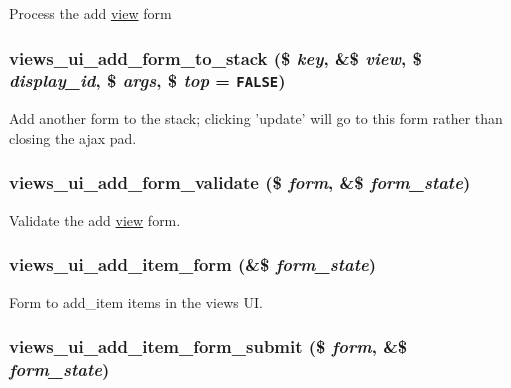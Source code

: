 Process the add \hyperlink{classview}{view} form \hypertarget{admin_8inc_1bdfd28818165d752db6270d3676fcbb}{
\subsubsection[{views\_\-ui\_\-add\_\-form\_\-to\_\-stack}]{\setlength{\rightskip}{0pt plus 5cm}views\_\-ui\_\-add\_\-form\_\-to\_\-stack (\$ {\em key}, \/  \&\$ {\em view}, \/  \$ {\em display\_\-id}, \/  \$ {\em args}, \/  \$ {\em top} = {\tt FALSE})}}
\label{admin_8inc_1bdfd28818165d752db6270d3676fcbb}


Add another form to the stack; clicking 'update' will go to this form rather than closing the ajax pad. \hypertarget{admin_8inc_3df2229c5921bd94cf778c96d8630b6a}{
\subsubsection[{views\_\-ui\_\-add\_\-form\_\-validate}]{\setlength{\rightskip}{0pt plus 5cm}views\_\-ui\_\-add\_\-form\_\-validate (\$ {\em form}, \/  \&\$ {\em form\_\-state})}}
\label{admin_8inc_3df2229c5921bd94cf778c96d8630b6a}


Validate the add \hyperlink{classview}{view} form. \hypertarget{admin_8inc_c391db5551c2725f1c483ea09bc6551a}{
\subsubsection[{views\_\-ui\_\-add\_\-item\_\-form}]{\setlength{\rightskip}{0pt plus 5cm}views\_\-ui\_\-add\_\-item\_\-form (\&\$ {\em form\_\-state})}}
\label{admin_8inc_c391db5551c2725f1c483ea09bc6551a}


Form to add\_\-item items in the views UI. \hypertarget{admin_8inc_b9af88d70446a68c6fac8afe2bc4cffe}{
\subsubsection[{views\_\-ui\_\-add\_\-item\_\-form\_\-submit}]{\setlength{\rightskip}{0pt plus 5cm}views\_\-ui\_\-add\_\-item\_\-form\_\-submit (\$ {\em form}, \/  \&\$ {\em form\_\-state})}}
\label{admin_8inc_b9af88d70446a68c6fac8afe2bc4cffe}


